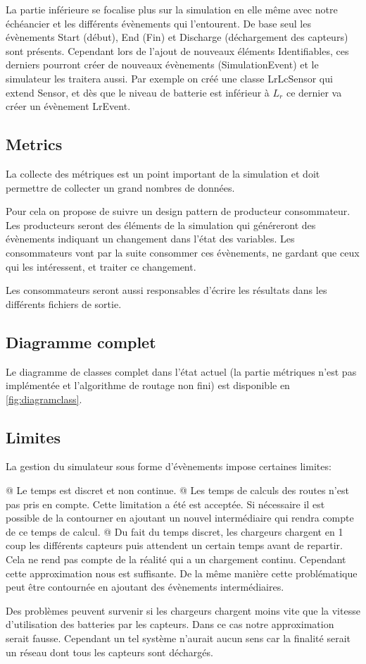 \documentclass[noposter,final]{polytech/polytech}
\begin{document}
			La partie inférieure se focalise plus sur la simulation en elle même avec notre échéancier et les différents évènements qui l'entourent.
			De base seul les évènements Start (début), End (Fin) et Discharge (déchargement des capteurs) sont présents.
			Cependant lors de l'ajout de nouveaux éléments Identifiables, ces derniers pourront créer de nouveaux évènements (SimulationEvent) et le simulateur les traitera aussi.
			Par exemple on créé une classe LrLcSensor qui extend Sensor, et dès que le niveau de batterie est inférieur à $L_r$ ce dernier va créer un évènement LrEvent.
		
		\subsection{Metrics}
			La collecte des métriques est un point important de la simulation et doit permettre de collecter un grand nombres de données.
			
			Pour cela on propose de suivre un design pattern de producteur consommateur.
			Les producteurs seront des éléments de la simulation qui généreront des évènements indiquant un changement dans l'état des variables.
			Les consommateurs vont par la suite consommer ces évènements, ne gardant que ceux qui les intéressent, et traiter ce changement.
			
			Les consommateurs seront aussi responsables d'écrire les résultats dans les différents fichiers de sortie.
			
		\subsection{Diagramme complet}
			Le diagramme de classes complet dans l'état actuel (la partie métriques n'est pas implémentée et l'algorithme de routage non fini) est disponible en \autoref{fig:diagramclass}.
			
		\subsection{Limites}
			La gestion du simulateur sous forme d'évènements impose certaines limites:
			\begin{easylist}[itemize]
				@ Le temps est discret et non continue.
				@ Les temps de calculs des routes n'est pas pris en compte.
				Cette limitation a été est acceptée.
				Si nécessaire il est possible de la contourner en ajoutant un nouvel intermédiaire qui rendra compte de ce temps de calcul.
				@ Du fait du temps discret, les chargeurs chargent en 1 coup les différents capteurs puis attendent un certain temps avant de repartir.
				Cela ne rend pas compte de la réalité qui a un chargement continu.
				Cependant cette approximation nous est suffisante.
				De la même manière cette problématique peut être contournée en ajoutant des évènements intermédiaires.
				
				Des problèmes peuvent survenir si les chargeurs chargent moins vite que la vitesse d'utilisation des batteries par les capteurs.
				Dans ce cas notre approximation serait fausse.
				Cependant un tel système n'aurait aucun sens car la finalité serait un réseau dont tous les capteurs sont déchargés.
			\end{easylist}
\end{document}
